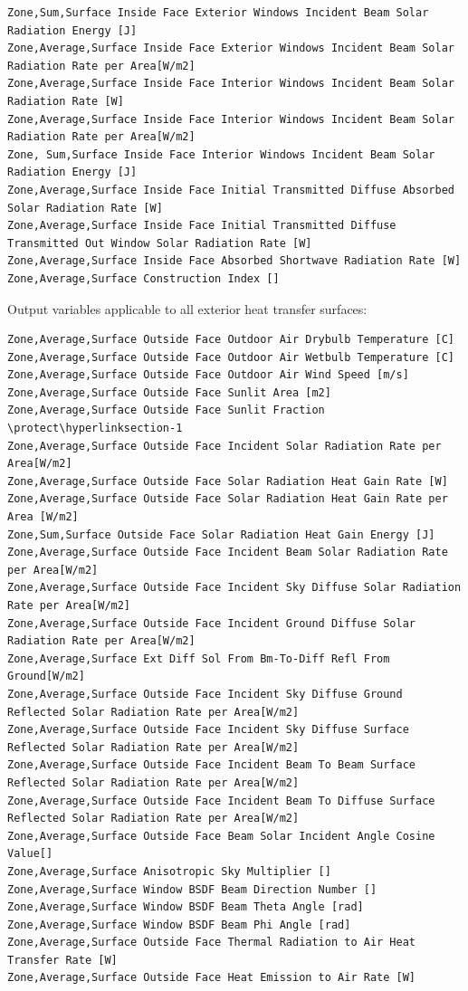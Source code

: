 \begin{lstlisting}
Zone,Sum,Surface Inside Face Exterior Windows Incident Beam Solar Radiation Energy [J]
Zone,Average,Surface Inside Face Exterior Windows Incident Beam Solar Radiation Rate per Area[W/m2]
Zone,Average,Surface Inside Face Interior Windows Incident Beam Solar Radiation Rate [W]
Zone,Average,Surface Inside Face Interior Windows Incident Beam Solar Radiation Rate per Area[W/m2]
Zone, Sum,Surface Inside Face Interior Windows Incident Beam Solar Radiation Energy [J]
Zone,Average,Surface Inside Face Initial Transmitted Diffuse Absorbed Solar Radiation Rate [W]
Zone,Average,Surface Inside Face Initial Transmitted Diffuse Transmitted Out Window Solar Radiation Rate [W]
Zone,Average,Surface Inside Face Absorbed Shortwave Radiation Rate [W]
Zone,Average,Surface Construction Index []
\end{lstlisting}

Output variables applicable to all exterior heat transfer surfaces:

\begin{lstlisting}
Zone,Average,Surface Outside Face Outdoor Air Drybulb Temperature [C]
Zone,Average,Surface Outside Face Outdoor Air Wetbulb Temperature [C]
Zone,Average,Surface Outside Face Outdoor Air Wind Speed [m/s]
Zone,Average,Surface Outside Face Sunlit Area [m2]
Zone,Average,Surface Outside Face Sunlit Fraction \protect\hyperlinksection-1
Zone,Average,Surface Outside Face Incident Solar Radiation Rate per Area[W/m2]
Zone,Average,Surface Outside Face Solar Radiation Heat Gain Rate [W]
Zone,Average,Surface Outside Face Solar Radiation Heat Gain Rate per Area [W/m2]
Zone,Sum,Surface Outside Face Solar Radiation Heat Gain Energy [J]
Zone,Average,Surface Outside Face Incident Beam Solar Radiation Rate per Area[W/m2]
Zone,Average,Surface Outside Face Incident Sky Diffuse Solar Radiation Rate per Area[W/m2]
Zone,Average,Surface Outside Face Incident Ground Diffuse Solar Radiation Rate per Area[W/m2]
Zone,Average,Surface Ext Diff Sol From Bm-To-Diff Refl From Ground[W/m2]
Zone,Average,Surface Outside Face Incident Sky Diffuse Ground Reflected Solar Radiation Rate per Area[W/m2]
Zone,Average,Surface Outside Face Incident Sky Diffuse Surface Reflected Solar Radiation Rate per Area[W/m2]
Zone,Average,Surface Outside Face Incident Beam To Beam Surface Reflected Solar Radiation Rate per Area[W/m2]
Zone,Average,Surface Outside Face Incident Beam To Diffuse Surface Reflected Solar Radiation Rate per Area[W/m2]
Zone,Average,Surface Outside Face Beam Solar Incident Angle Cosine Value[]
Zone,Average,Surface Anisotropic Sky Multiplier []
Zone,Average,Surface Window BSDF Beam Direction Number []
Zone,Average,Surface Window BSDF Beam Theta Angle [rad]
Zone,Average,Surface Window BSDF Beam Phi Angle [rad]
Zone,Average,Surface Outside Face Thermal Radiation to Air Heat Transfer Rate [W]
Zone,Average,Surface Outside Face Heat Emission to Air Rate [W]
\end{lstlisting}

